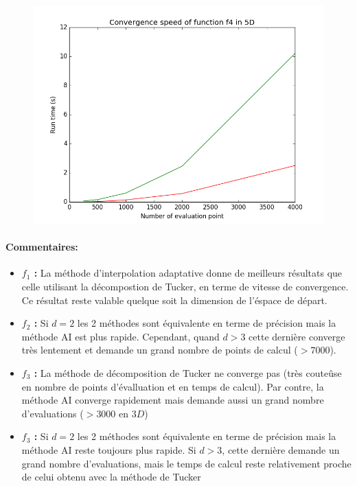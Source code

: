 \begin{figure}[h]
\begin{minipage}[b]{0.32\linewidth}
				\centering \includegraphics[scale=0.3]{images/f4_5d_s.png}
		\end{minipage}
\end{figure}
\newpage
\paragraph{Commentaires:}
\begin{itemize}
	\item \textbf{$f_1$ :} La méthode d'interpolation adaptative donne de meilleurs résultats que celle utilisant la décompostion de Tucker, en terme de vitesse de convergence. Ce résultat reste valable quelque soit la dimension de l'éspace de départ.

	\item \textbf{$f_2$ :} Si $d=2$ les 2 méthodes sont équivalente en terme de précision mais la méthode AI est plus rapide. Cependant, quand $d>3$ cette dernière converge très lentement et demande un grand nombre de points de calcul ($>7000$).

	\item \textbf{$f_3$ :} La méthode de décomposition de Tucker ne converge pas (très couteûse en nombre de points d'évalluation et en temps de calcul). Par contre, la méthode AI converge rapidement mais demande aussi un grand nombre d’evaluations ($>3000$ en $3D$)

	\item \textbf{$f_3$ :} Si $d=2$ les 2 méthodes sont équivalente en terme de précision mais la méthode AI reste toujours plus rapide. Si $d>3$, cette dernière demande un grand nombre d’evaluations, mais le temps de calcul reste relativement proche de celui obtenu avec la méthode de Tucker
\end{itemize}

